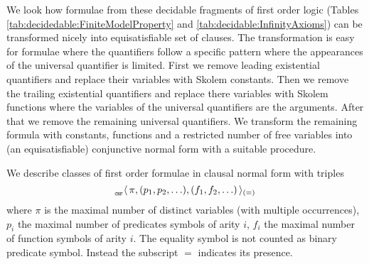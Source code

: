 


We look how formulae from these decidable fragments of first order logic 
(Tables \ref{tab:decidedable:FiniteModelProperty} and \ref{tab:decidable:InfinityAxioms})
can be transformed nicely into equisatisfiable set of clauses.
The transformation is easy for formulae where the quantifiers follow a specific pattern where the appearances of the universal quantifier is limited. First we remove leading existential quantifiers and replace their variables with Skolem constants.
Then we remove the trailing existential quantifiers and replace there variables with Skolem functions where the variables of the universal quantifiers are the arguments. After that we remove the remaining universal quantifiers. We transform the remaining formula with constants, functions and a restricted number of free variables into (an equisatisfiable) conjunctive normal form with a suitable procedure. 

\begin{definition}\label{def:prefix:class}
	We describe classes of first order formulae in clausal normal form with triples
	\[
	_{_\texttt{CNF}}\langle\, \pi, (p_1,p_2,\ldots), (f_1,f_2,\ldots)\,\rangle_{(=)}
	\]
	where $\pi$ is the maximal number of distinct variables (with multiple occurrences),
	$p_i$ the maximal number of predicates symbols of arity $i$,
	$f_i$ the maximal number of function symbols of arity $i$.
	The equality symbol is not counted as binary predicate symbol.
	Instead the subscript $=$ indicates its presence.
\end{definition}

